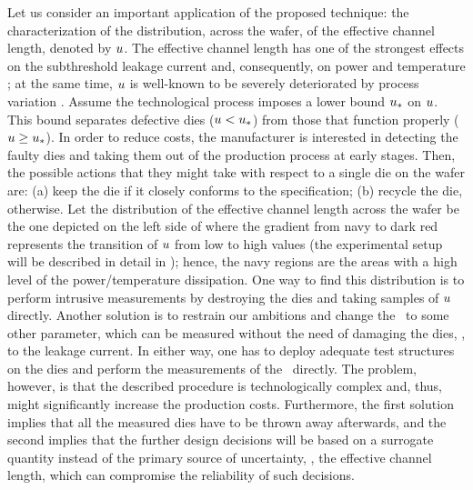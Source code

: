 
Let us consider an important application of the proposed technique: the characterization of the distribution, across the wafer, of the effective channel length, denoted by $u$. The effective channel length has one of the strongest effects on the subthreshold leakage current and, consequently, on power and temperature \cite{juan2011, juan2012}; at the same time, $u$ is well-known to be severely deteriorated by process variation \cite{chandrakasan2001, srivastava2010}.
Assume the technological process imposes a lower bound $u_*$ on $u$. This bound separates defective dies ($u < u_*$) from those that function properly ($u \geq u_*$).
In order to reduce costs, the manufacturer is interested in detecting the faulty dies and taking them out of the production process at early stages. Then, the possible actions that they might take with respect to a single die on the wafer are: (a) keep the die if it closely conforms to the specification; (b) recycle the die, otherwise.
Let the distribution of the effective channel length across the wafer be the one depicted on the left side of  where the gradient from navy to dark red represents the transition of $u$ from low to high values (the experimental setup will be described in detail in ); hence, the navy regions are the areas with a high level of the power/temperature dissipation.
One way to find this distribution is to perform intrusive measurements by destroying the dies and taking samples of $u$ directly. Another solution is to restrain our ambitions and change the \qoi\ to some other parameter, which can be measured without the need of damaging the dies, \eg, to the leakage current. In either way, one has to deploy adequate test structures on the dies and perform the measurements of the \qoi\ directly. The problem, however, is that the described procedure is technologically complex and, thus, might significantly increase the production costs. Furthermore, the first solution implies that all the measured dies have to be thrown away afterwards, and the second implies that the further design decisions will be based on a surrogate quantity instead of the primary source of uncertainty, \ie, the effective channel length, which can compromise the reliability of such decisions.

